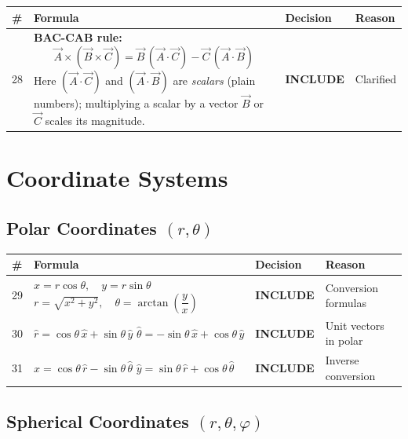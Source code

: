 \documentclass[11pt,a4paper]{article}
\newcommand{\inc}{\textbf{\textcolor{incgreen}{INCLUDE}}}
\begin{document}
\begin{longtable}{p{0.5cm} p{7.5cm} p{2.2cm} p{3.5cm}}
\toprule
\# & Formula & Decision & Reason \\
\midrule
\endhead
28 & \textbf{BAC-CAB rule:}
\[ \vec{A}\times(\vec{B}\times\vec{C}) = \vec{B}\,(\vec{A}\cdot\vec{C}) - \vec{C}\,(\vec{A}\cdot\vec{B}) \]
Here $(\vec{A}\cdot\vec{C})$ and $(\vec{A}\cdot\vec{B})$ are \emph{scalars} (plain numbers); multiplying a scalar by a vector $\vec{B}$ or $\vec{C}$ scales its magnitude. & \inc & Clarified \\[14pt]
\bottomrule
\end{longtable}

\section{Coordinate Systems}

\subsection{Polar Coordinates $(r, \theta)$}

\begin{longtable}{p{0.5cm} p{7.5cm} p{2.2cm} p{3.5cm}}
\toprule
\# & Formula & Decision & Reason \\
\midrule
\endhead
29 & $x = r\cos\theta,\quad y = r\sin\theta$ \newline
   $r = \sqrt{x^2+y^2},\quad \theta = \arctan\!\left(\dfrac{y}{x}\right)$ & \inc & Conversion formulas \\[14pt]
30 & $\hat{r} = \cos\theta\,\hat{x} + \sin\theta\,\hat{y}$ \newline
   $\hat{\theta} = -\sin\theta\,\hat{x} + \cos\theta\,\hat{y}$ & \inc & Unit vectors in polar \\[10pt]
31 & $\hat{x} = \cos\theta\,\hat{r} - \sin\theta\,\hat{\theta}$ \newline
   $\hat{y} = \sin\theta\,\hat{r} + \cos\theta\,\hat{\theta}$ & \inc & Inverse conversion \\[6pt]
\bottomrule
\end{longtable}

\subsection{Spherical Coordinates $(r, \theta, \varphi)$}
\end{document}
